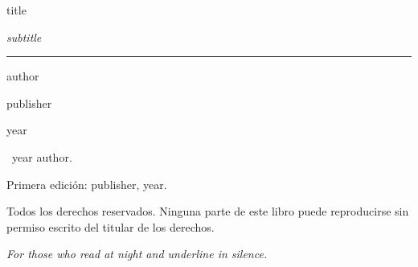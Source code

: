 \documentclass[11pt,openany]{book}
\newcommand{\lblFirstEdition}{First edition}
\newcommand{\lblRights}{All rights reserved. No part of this book may be reproduced without written permission from the rights holder.}
\renewcommand{\lblFirstEdition}{Primera edición}
\renewcommand{\lblRights}{Todos los derechos reservados. Ninguna parte de este libro puede reproducirse sin permiso escrito del titular de los derechos.}
\begin{document}
  \frontmatter

  \begin{titlepage}
    \thispagestyle{empty}
    \vspace*{\fill}
    \centering
    {\Large {{title}} \par}
    \vspace*{\fill}
  \end{titlepage}

  \begin{titlepage}
    \centering
    {\fontsize{34}{38} \par}
    \vspace{0.5cm}
    {\Large\itshape\color{bookmuted} {{subtitle}} \par}
    \vspace{0.8cm}
    {\color{bookmark}\rule{0.3\textwidth}{2pt}\par}
    \vspace{0.8cm}
    {\Large {{author}} \par}
    \vfill
    {{publisher}} \par
    {{year}} \par
  \end{titlepage}

  \thispagestyle{empty}
  \noindent \textcopyright\ {{year}} {{author}}. \par
  \noindent \lblFirstEdition: {{publisher}}, {{year}}. \par
  \vspace{0.4cm}
  \noindent \lblRights \par
  \clearpage

  \thispagestyle{empty}
  \vspace*{\fill}
  \begin{flushright}
    \textit{For those who read at night and underline in silence.}
  \end{flushright}
  \vspace*{\fill}
  \clearpage
\end{document}
